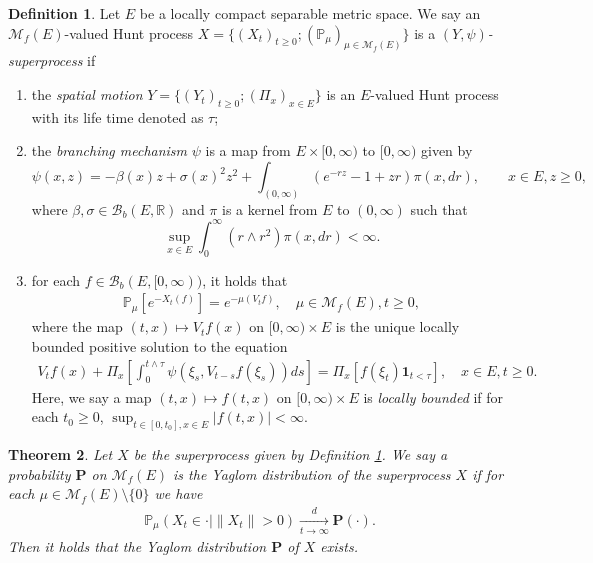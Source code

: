 \documentclass[12pt,a4paper]{amsart}
\numberwithin{equation}{section}
\theoremstyle{plain}
\newtheorem{thm}{Theorem}[section]
\theoremstyle{definition}
\newtheorem{defi}[thm]{Definition}
\begin{document}
\begin{defi}
  \label{def:IRS}
Let $E$ be a locally compact separable metric space. 
We say an $\mathcal M_f(E)$-valued Hunt process $X= \{(X_t)_{t\geq 0}; (\mathbb P_\mu)_{\mu\in \mathcal M_f(E)}\}$ is a \emph{$(Y,\psi)$-superprocess} if
\begin{enumerate}
\item
\label{def:IRS1}
  the \emph{spatial motion} $Y=\{(Y_t)_{t\geq 0};(\Pi_x)_{x\in E}\}$ is an $E$-valued Hunt process with its life time denoted as $\tau$;
\item
  \label{def:IRS2}
  the \emph{branching mechanism} $\psi$ is a map from $E\times[0,\infty)$ to $[0,\infty)$ given by
  \[
    \psi(x,z)
    =-\beta(x)z + \sigma(x)^2 z^2+ \int_{(0,\infty)} (e^{-rz}-1+zr ) \pi(x, dr),\qquad x\in E, z\geq0,
  \]
  where $\beta, \sigma\in \mathcal B_b(E,\mathbb R)$ and $\pi$ is a kernel from $E$ to $(0,\infty)$ such that
  \[
    \sup_{x\in E}\int_0^\infty (r\wedge r^2)\pi(x,dr)
    <\infty.
  \]
\item
  \label{def:IRS3}
  for each $f\in \mathcal B_b(E,[0,\infty))$, it holds that
  \begin{align}
    \mathbb P_\mu [e^{- X_t(f)}] = e^{-\mu(V_tf)},
    \quad \mu \in \mathcal M_f(E),t\geq 0,
  \end{align}
  where the map $(t,x) \mapsto V_tf(x)$ on $[0,\infty) \times E$ is the unique locally bounded positive solution to the equation
  \begin{align}
    V_t f(x) +   \Pi_x[\int_0^{t\wedge \tau} \psi (\xi_s,V_{t-s} f(\xi_s)) ds]
    = \Pi_x[f(\xi_t) \mathbf 1_{t < \tau}],
    \quad x \in E, t \geq 0.
  \end{align}
  Here, we say a map $(t,x) \mapsto f(t,x)$ on $[0,\infty)\times E$ is \emph{locally bounded} if for each $t_0 \geq 0$, $\sup_{t\in [0,t_0], x\in E} |f(t,x)| < \infty$.
\end{enumerate}
\end{defi}

\begin{thm}
  \label{thm:IRY}
	Let $X$ be the superprocess given by Definition \ref{def:IRS}. 
  We say a probability ${\mathbf P}$ on $\mathcal M_f(E)$ is the \emph{Yaglom distribution} of the superprocess $X$ if for each $\mu\in \mathcal M_f(E)\setminus\{0\}$ we have
  \begin{align}
    \mathbb P_\mu(X_t \in \cdot | \|X_t\|>0) 
    \xrightarrow[t\to \infty]{d} {\mathbf P}(\cdot).
  \end{align}
  Then it holds that the Yaglom distribution $\mathbf P$ of $X$ exists.
\end{thm}
\end{document}
